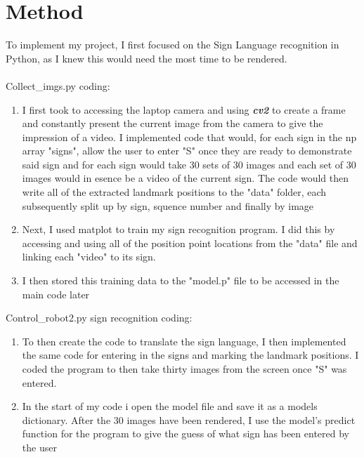 \documentclass[lettersize,journal]{IEEEtran}
\begin{document}
\section{Method }

To implement my project, I first focused on the Sign Language recognition in Python, as I knew this would need the most time to be rendered. 
\\
\\
Collect\_imgs.py coding:
\begin{enumerate}
\item{ I first took to accessing the laptop camera and using  \textbf{\textit{cv2}} to create a frame and constantly present the current image from the camera to give the impression of a video. I implemented code that would, for each sign in the np array "signs", allow the user to enter "S" once they are ready to demonstrate said sign and for each sign would take 30 sets of 30 images and each set of 30 images would in esence be a video of the current sign. The code would then write all of the extracted landmark positions to the "data" folder, each subsequently split up by sign, squence number and finally by image   }
\item{Next, I used matplot to train my sign recognition program. I did this by accessing and using all of the position point locations from the "data" file and linking each "video" to its sign. }
\item{I then stored this training data to the "model.p" file to be accessed in the main code later}


\end{enumerate}

Control\_robot2.py sign recognition coding: 
\begin{enumerate}
\item{To then create the code to translate the sign language, I then implemented the same code for entering in the signs and marking the landmark positions. I coded the program to then take thirty images from the screen once "S" was entered.  }
\item{In the start of my code i open the model file and save it as a models dictionary. After the 30 images have been rendered, I use the model's predict function for the program to give the guess of what sign has been entered by the user }

\end{enumerate}
\end{document}
